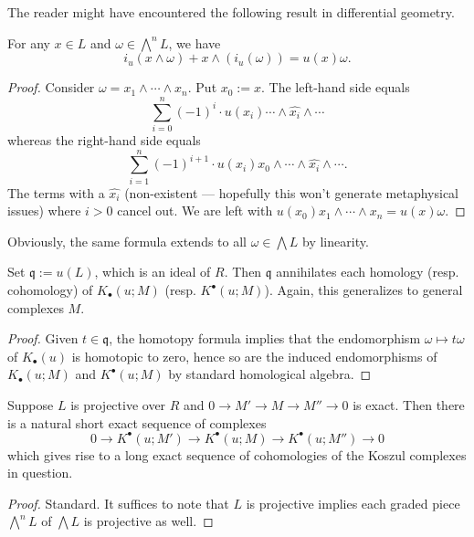 The reader might have encountered the following result in differential geometry.
\begin{proposition}
	For any $x \in L$ and $\omega \in \bigwedge^n L$, we have
	\[ i_u (x \wedge \omega) + x \wedge (i_u(\omega)) = u(x) \omega. \]
\end{proposition}
\begin{proof}
	Consider $\omega = x_1 \wedge \cdots \wedge x_n$. Put $x_0 := x$. The left-hand side equals
	\[ \sum_{i=0}^n (-1)^i \cdot u(x_i) \cdots \wedge \widehat{x_i} \wedge \cdots  \]
	whereas the right-hand side equals
	\[ \sum_{i=1}^n (-1)^{i+1} \cdot u(x_i) x_0 \wedge \cdots \wedge \widehat{x_i} \wedge \cdots. \]
	The terms with a $\widehat{x_i}$ (non-existent --- hopefully this won't generate metaphysical issues) where $i > 0$ cancel out. We are left with $u(x_0) x_1 \wedge \cdots \wedge x_n = u(x) \omega$.
\end{proof}
Obviously, the same formula extends to all $\omega \in \bigwedge L$ by linearity.

\begin{proposition}\label{prop:Koszul-u-vanishing}
	Set $\mathfrak{q} := u(L)$, which is an ideal of $R$. Then $\mathfrak{q}$ annihilates each homology (resp. cohomology) of $K_\bullet(u; M)$ (resp. $K^\bullet(u; M)$). Again, this generalizes to general complexes $M$.
\end{proposition}
\begin{proof}
	Given $t \in \mathfrak{q}$, the homotopy formula implies that the endomorphism $\omega \mapsto t\omega$ of $K_\bullet(u)$ is homotopic to zero, hence so are the induced endomorphisms of $K_\bullet(u; M)$ and $K^\bullet(u; M)$ by standard homological algebra.
\end{proof}

\begin{proposition}\label{prop:Koszul-long-exact-sequence}
	Suppose $L$ is projective over $R$ and $0 \to M' \to M \to M'' \to 0$ is exact. Then there is a natural short exact sequence of complexes
	\[ 0 \to K^\bullet(u; M') \to K^\bullet(u; M) \to K^\bullet(u; M'') \to 0 \]
	which gives rise to a long exact sequence of cohomologies of the Koszul complexes in question.
\end{proposition}
\begin{proof}
	Standard. It suffices to note that $L$ is projective implies each graded piece $\bigwedge^n L$ of $\bigwedge L$ is projective as well.
\end{proof}

